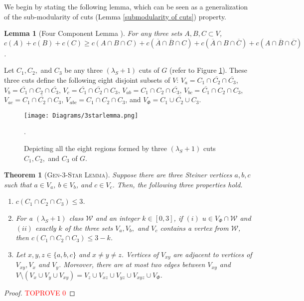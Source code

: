 \documentclass[letterpaper,11pt]{article}
\newtheorem{theorem}{Theorem}[]
\newtheorem{lemma}{Lemma}[]
\begin{document}
We begin by stating the following lemma, which can be seen as a generalization of the sub-modularity of cuts (Lemma \ref{submodularity of cuts}) property.
\begin{lemma} [Four Component Lemma \cite{DBLP:conf/focs/Benczur95}] \label{lem : four component lemma}
    For any three sets $A,B,C\subset V$, $c(A)+c(B)+c(C)\ge c(A\cap B\cap C)+c(\overline{A}\cap \overline{B}\cap C)+c(\overline{A}\cap B \cap \overline{C})+c(A\cap \overline{B}\cap \overline{C})$.
\end{lemma}
Let $C_1, C_2,$ and $C_3$ be any three $(\lambda_S+1)$ cuts of $G$ (refer to Figure \ref{fig : regions of three cuts}). These three cuts define the following eight disjoint subsets of $V$: $V_a=C_1\cap \overline{C_2}\cap \overline{C_3}$, $V_b=\overline{C_1}\cap C_2 \cap \overline{C_3}$, $V_c=\overline{C_1}\cap \overline{C_2}\cap C_3$, $V_{ab}=C_1\cap C_2\cap \overline{C_3}$, $V_{bc}=\overline{C_1}\cap C_2\cap C_3$, $V_{ac}=C_1\cap \overline{C_2}\cap C_3$, $V_{abc}=C_1\cap C_2\cap C_3$, and $V_{\Phi}=\overline{C_1\cup C_2\cup C_3}$.    
  \begin{figure}
 \centering
    \texttt{[image: Diagrams/3starlemma.png]} 
   \caption{Depicting all the eight regions formed by three $(\lambda_S+1)$ cuts $C_1,C_2,$ and $C_3$ of $G$.}
  \label{fig : regions of three cuts}. 
\end{figure}
\begin{theorem}[\textsc{Gen-3-Star Lemma}] \label{thm : gen 3 star} Suppose there are three Steiner vertices $a,b,c$ such that $a\in V_a$, $b\in V_b$, and $c\in V_c$.
Then, the following three properties hold.
    \begin{enumerate}
        \item $c(C_1\cap C_2 \cap C_3)\le 3$.
        \item For a $(\lambda_S+1)$ class ${\mathcal W}$ and an integer $k\in [0,3]$, if $(i)$ $u\in V_{\Phi}\cap {\mathcal W}$ and $(ii)$ exactly $k$ of the three sets $V_a,V_b,$ and $V_c$ contains a vertex from ${\mathcal W}$, then $c(C_1\cap C_2\cap C_3)\le 3-k$. 
        \item Let $x,y,z\in \{a,b,c\}$ and $x\ne y\ne z$. 
        Vertices of $V_{xy}$ are adjacent to vertices of $V_{xy}, V_x$ and $V_y$. Moreover, there are at most two edges between $V_{xy}$ and $V\setminus (V_x\cup V_y\cup V_{xy})=V_z\cup V_{xz} \cup V_{yz}\cup V_{xyz}\cup V_{\Phi}$. 
    \end{enumerate}
\end{theorem}
\begin{proof}\textcolor{red}{TOPROVE 0}\end{proof}
\end{document}
